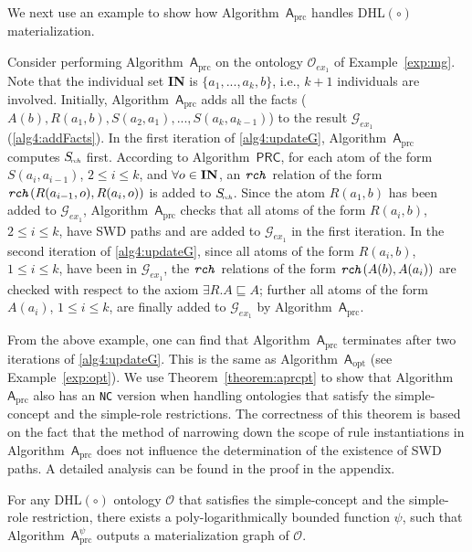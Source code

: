 We next use an example to show how Algorithm~$\mathsf{A}_{\text{prc}}$ handles
DHL$(\circ)$ materialization.

\begin{example}\label{exp:prc}
Consider performing Algorithm~$\mathsf{A}_{\text{prc}}$ on the ontology
$\mathcal{O}_{ex_1}$ of Example~\ref{exp:mg}. Note that the individual
set \textbf{IN} is $\{a_1,...,a_k,b\}$, i.e., $k+1$ individuals are involved.
Initially, Algorithm~$\mathsf{A}_{\text{prc}}$ adds
all the facts ($A(b),R(a_1,b),S(a_2,a_1),...,S(a_{k},a_{k-1})$) to the
result $\mathcal{G}_{ex_1}$ (\ref{alg4:addFacts}). In the first iteration of
\ref{alg4:updateG}, Algorithm~$\mathsf{A}_{\text{prc}}$ computes $S_{\textit{\!\tiny rch}}$ first.
According to Algorithm~$\mathsf{PRC}$, for each atom of the form
$S(a_i,a_{i-1})$, $2\leq i\leq k$,
and $\forall o\in \mbox{\textbf{IN}}$,
an $\texttt{\emph{rch}}$ relation of the form $\texttt{\emph{rch}}(R(a_{i-1},o),R(a_i,o))$ is added to
$S_{\textit{\!\tiny rch}}$. Since the atom $R(a_1,b)$ has been added to $\mathcal{G}_{ex_1}$,
Algorithm~$\mathsf{A}_{\text{prc}}$ checks that all atoms of the form
$R(a_i,b)$, $2\leq i\leq k$,
have SWD paths and are added to $\mathcal{G}_{ex_1}$ in the first iteration.
In the second iteration of \ref{alg4:updateG}, since all atoms of the
form $R(a_i,b)$, $1\leq i\leq k$,
have been in $\mathcal{G}_{ex_1}$, the $\texttt{\emph{rch}}$ relations of the form $\texttt{\emph{rch}}(A(b),A(a_i))$
are checked with respect to the axiom $\exists R.A\sqsubseteq A$; further all
atoms of the form $A(a_i)$, $1\leq i\leq k$, are finally added to $\mathcal{G}_{ex_1}$
by Algorithm~$\mathsf{A}_{\text{prc}}$.
\end{example}

From the above example, one can find that Algorithm~$\mathsf{A}_{\text{prc}}$ terminates after two iterations
of \ref{alg4:updateG}. This is the same as Algorithm~$\mathsf{A}_{\text{opt}}$ (see Example~\ref{exp:opt}).
We use Theorem~\ref{theorem:aprcpt} to show that Algorithm~$\mathsf{A}_{\text{prc}}$ also has an \texttt{NC} version when handling ontologies
that satisfy the simple-concept and the simple-role restrictions.
The correctness of this theorem is based on the fact that the method of narrowing down the scope of rule instantiations in Algorithm~$\mathsf{A}_{\text{prc}}$
does not influence the determination of the existence of SWD paths. A detailed analysis
can be found in the proof in the appendix.

\begin{theorem}\label{theorem:aprcpt}
For any DHL$(\circ)$ ontology $\mathcal{O}$ that satisfies the simple-concept and the simple-role
restriction,
there exists a poly-logarithmically bounded function $\psi$,
such that Algorithm~$\mathsf{A}_{\text{prc}}^{\psi}$ outputs
a materialization graph of $\mathcal{O}$.
\end{theorem}




